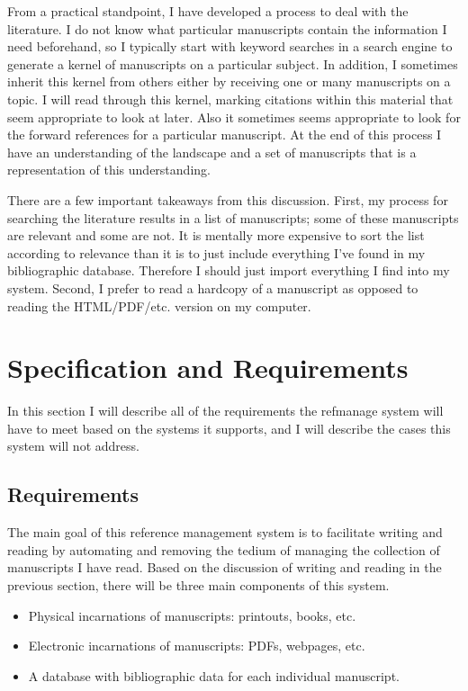 \documentclass[letterpaper,12pt]{article}
\begin{document}
From a practical standpoint, I have developed a process to deal with the literature. I do not know what particular manuscripts contain the information I need beforehand, so I typically start with keyword searches in a search engine to generate a kernel of manuscripts on a particular subject. In addition, I sometimes inherit this kernel from others either by receiving one or many manuscripts on a topic. I will read through this kernel, marking citations within this material that seem appropriate to look at later. Also it sometimes seems appropriate to look for the forward references for a particular manuscript. At the end of this process I have an understanding of the landscape and a set of manuscripts that is a representation of this understanding.

There are a few important takeaways from this discussion. First, my process for searching the literature results in a list of manuscripts; some of these manuscripts are relevant and some are not. It is mentally more expensive to sort the list according to relevance than it is to just include everything I've found in my bibliographic database. Therefore I should just import everything I find into my system. Second, I prefer to read a hardcopy of a manuscript as opposed to reading the HTML/PDF/etc. version on my computer.








\section{Specification and Requirements}
In this section I will describe all of the requirements the refmanage system will have to meet based on the systems it supports, and I will describe the cases this system will not address.


\subsection{Requirements}
The main goal of this reference management system is to facilitate writing and reading by automating and removing the tedium of managing the collection of manuscripts I have read. Based on the discussion of writing and reading in the previous section, there will be three main components of this system.

\begin{itemize}
\item Physical incarnations of manuscripts: printouts, books, etc.
\item Electronic incarnations of manuscripts: PDFs, webpages, etc.
\item A database with bibliographic data for each individual manuscript.
\end{itemize}
\end{document}
